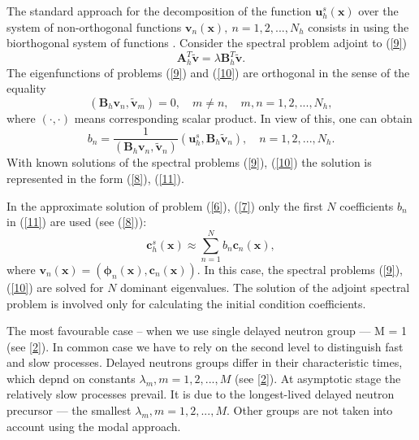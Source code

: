 \documentclass[a4paper]{jpconf}
\begin{document}
The standard approach for the decomposition of the function  $\bm u_h^s (\bm x) $ 
over the system of non-orthogonal functions $\bm v_n(\bm x), \ n = 1,2, ..., N_h$ 
consists in using the biorthogonal system of functions 
\cite{henry1975nuclear,brezinski1991biorthogonality}. 
Consider the spectral problem adjoint to (\ref{9})  
\begin{equation}\label{10}
 \bm A_h^T \widetilde{\bm v}  = \lambda  \bm B_h^T \widetilde{\bm v} .
\end{equation} 
The eigenfunctions of problems  (\ref{9}) and (\ref{10}) are orthogonal \cite{Laub2005,Ortega1987}  in the sense of the equality
\[
  (\bm B_h \bm v_n, \widetilde{\bm v}_m)= 0, 
  \quad m \neq n,
  \quad m, n = 1,2, ..., N_h , 
\] 
where $(\cdot, \cdot)$ means corresponding scalar product. 
In view of this, one can obtain
\begin{equation}\label{11}
 b_n = \frac{1}{(\bm B_h \bm v_n, \widetilde{\bm v}_n)} (\bm u_h^s, \bm B_h \widetilde{\bm v}_n),
 \quad n = 1,2, ..., N_h .  
\end{equation} 
With known solutions of the spectral problems  (\ref{9}), (\ref{10}) the solution is represented in the form (\ref{8}), (\ref{11}).

In the approximate solution of problem   (\ref{6}), (\ref{7}) only the first $N$ coefficients  $b_n$ in (\ref{11}) are used (see (\ref{8})):
\begin{equation}\label{12}
 \bm c_h^s (\bm x) \approx  \sum_{n=1}^{N} b_n \bm c_n(\bm x) ,
\end{equation} 
where $\bm v_n (\bm x) = (\bm \phi_n (\bm x), \bm c_n (\bm x))$.
In this case, the spectral problems  (\ref{9}), (\ref{10}) are solved for $N$ dominant 
eigenvalues.
The solution of the adjoint spectral problem is involved only for calculating the initial condition coefficients. 

The most favourable case -- when we use single delayed neutron group ---
M = 1 (see \ref{2}). In common case we have to rely on the second level to distinguish
fast and slow processes. Delayed neutrons groups differ in their characteristic
times, which depnd on constants $\lambda_m, m = 1, 2, ..., M$ (see \ref{2}). At asymptotic
stage the relatively slow processes prevail. It is due to the longest-lived delayed
neutron precursor --- the smallest $\lambda_m, m = 1, 2, ..., M$. Other groups are not
taken into account using the modal approach.
\end{document}
